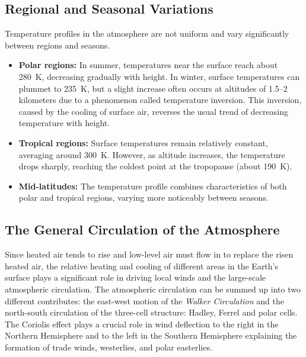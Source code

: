 \subsection*{Regional and Seasonal Variations}

Temperature profiles in the atmosphere are not uniform and vary significantly between regions and seasons.

\begin{itemize}
	\item \textbf{Polar regions:} In summer, temperatures near the surface reach about 280~K, decreasing gradually with height. In winter, surface temperatures can plummet to 235~K, but a slight increase often occurs at altitudes of 1.5--2 kilometers due to a phenomenon called temperature inversion. This inversion, caused by the cooling of surface air, reverses the usual trend of decreasing temperature with height.
	\item \textbf{Tropical regions:} Surface temperatures remain relatively constant, averaging around 300~K. However, as altitude increases, the temperature drops sharply, reaching the coldest point at the tropopause (about 190~K).
	\item \textbf{Mid-latitudes:} The temperature profile combines characteristics of both polar and tropical regions, varying more noticeably between seasons.
\end{itemize}
\subsection{The General Circulation of the Atmosphere}\label{chp:GeneralCirculation}

Since heated air tends to rise and low-level air must flow in to replace the risen heated air, the relative heating and cooling of different areas in the Earth’s surface plays a significant role in driving local winds and the large-scale atmospheric circulation.
The atmospheric circulation can be summed up into two different contributes: the east-west motion of the \textit{Walker Circulation} and the north-south circulation of the
three-cell structure: Hadley, Ferrel and polar cells. The Coriolis effect plays a crucial role in wind deflection to the right in the Northern Hemisphere and to the left in the Southern Hemisphere explaining the formation of trade winds, westerlies, and polar easterlies.

